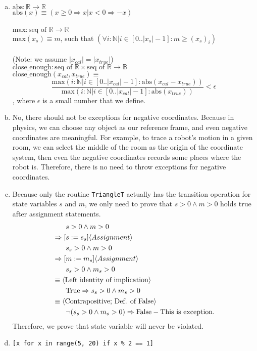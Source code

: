 \documentclass[12pt]{article}
\begin{document}
\begin{enumerate}[a)]
\item \noindent $\text{abs}: \mathbb{R} \rightarrow \mathbb{R}$\\
		\noindent $\text{abs}(x) \equiv (x \geq 0 \Rightarrow x | x < 0 \Rightarrow -x)$\\\\
		 \noindent $\text{max}: \text{seq of } \mathbb{R} \rightarrow \mathbb{R}$\\
		 \noindent $\text{max}(x_s) \equiv m$, such that $(\forall i : \mathbb{N} | i \in [0..|x_s|-1] : m \geq (x_s)_i)$\\\\
		 \noindent (Note: we assume $|x_{cal}| = |x_{true}|$)\\
		 \noindent $\text{close\_enough}: \text{seq of } \mathbb{R} \times \text{seq of } \mathbb{R} \rightarrow \mathbb{B}$\\
		 \noindent $\text{close\_enough}(x_{cal}, x_{true}) \equiv$ $$ \frac{\text{max}(i: \mathbb{N} | i \in [0..|x_{cal}|-1] : \text{abs}(x_{cal} - x_{true}))}{\text{max}(i: \mathbb{N} | i \in [0..|x_{cal}|-1] : \text{abs}(x_{true}))} < \epsilon$$, where $\epsilon$ is a small number that we define.
		 
\item No, there should not be exceptions for negative coordinates. Because in physics, we can choose any object as our reference frame, and even negative coordinates are meaningful. For example, to trace a robot's motion in a given room, we can select the middle of the room as the origin of the coordinate system, then even the negative coordinates records some places where the robot is. Therefore, there is no need to throw exceptions for negative coordinates.

\item Because only the routine \verb|TriangleT| actually has the transition operation for state variables $s$ and $m$, we only need to prove that $s > 0 \land m > 0$ holds true after assignment statements.
\begin{align*}
&\phantom{{}==} s > 0 \land m > 0 \\
&\Rightarrow[ s := s_s ] \langle Assignment \rangle \\
&\phantom{{}==}s_s > 0 \land m > 0 \\
&\Rightarrow[ m := m_s ] \langle Assignment \rangle  \\
&\phantom{{}==}s_s > 0 \land m_s > 0 \\
&\equiv \langle \text{Left identity of implication} \rangle\\
&\phantom{{}==} \text{True} \Rightarrow s_s > 0 \land m_s > 0\\
&\equiv \langle \text{Contrapositive; Def. of False} \rangle\\
&\phantom{{}==} \neg (s_s > 0 \land m_s > 0) \Rightarrow \text{False} \-- \text{This is exception.}
\end{align*}
Therefore, we prove that state variable will never be violated.
\item
\begin{lstlisting}
[x for x in range(5, 20) if x % 2 == 1] 
\end{lstlisting}


\end{enumerate}
\end{document}
